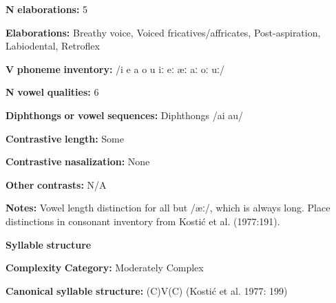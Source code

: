 \documentclass[output=paper]{langsci/langscibook}
\begin{document}
\begin{styleBody}
\textbf{N} \textbf{elaborations:} 5
\end{styleBody}

\begin{styleBody}
\textbf{Elaborations:} Breathy voice, Voiced fricatives/affricates, Post-aspiration, Labiodental, Retroflex
\end{styleBody}

\begin{styleBody}
\textbf{V} \textbf{phoneme} \textbf{inventory:} /i e a o u iː eː æː aː oː uː/
\end{styleBody}

\begin{styleBody}
\textbf{N} \textbf{vowel} \textbf{qualities:} 6
\end{styleBody}

\begin{styleBody}
\textbf{Diphthongs} \textbf{or} \textbf{vowel} \textbf{sequences:} Diphthongs /ai au/
\end{styleBody}

\begin{styleBody}
\textbf{Contrastive} \textbf{length:} Some
\end{styleBody}

\begin{styleBody}
\textbf{Contrastive} \textbf{nasalization:} None
\end{styleBody}

\begin{styleBody}
\textbf{Other} \textbf{contrasts:} N/A
\end{styleBody}

\begin{styleBody}
\textbf{Notes:} Vowel length distinction for all but /æː/, which is always long. Place distinctions in consonant inventory from Kostić et al. (1977:191).
\end{styleBody}

\begin{styleBody}
\textbf{Syllable} \textbf{structure}
\end{styleBody}

\begin{styleBody}
\textbf{Complexity} \textbf{Category:} Moderately Complex
\end{styleBody}

\begin{styleBody}
\textbf{Canonical} \textbf{syllable} \textbf{structure:} (C)V(C) (Kostić et al. 1977: 199)
\end{styleBody}
\end{document}
